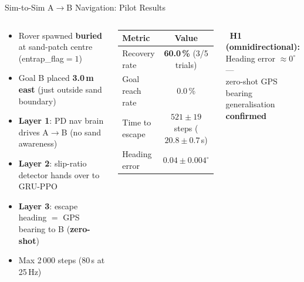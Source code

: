 \documentclass[aspectratio=169, 10pt]{beamer}
\newcommand{\keyword}[1]{\textbf{\color{MarsLight}#1}}
\newcommand{\tick}{\textcolor{AccentGreen}{\faCheckCircle}}
\begin{document}
\begin{frame}{Sim-to-Sim A$\to$B Navigation: Pilot Results}
\vspace{-0.2em}
\begin{columns}[T]

\begin{tcolorbox}[mycard, title={\faFlask\; Experimental Setup ($N{=}5$ trials)}]
  \scriptsize
  \begin{itemize}[leftmargin=1em, itemsep=2pt]
    \item Rover spawned \keyword{buried} at sand-patch centre (entrap\_flag$=1$)
    \item Goal B placed \textbf{3.0\,m east} (just outside sand boundary)
    \item \textbf{Layer 1}: PD nav brain drives A$\to$B (no sand awareness)
    \item \textbf{Layer 2}: slip-ratio detector hands over to GRU-PPO
    \item \textbf{Layer 3}: escape heading $=$ GPS bearing to B (\keyword{zero-shot})
    \item Max 2\,000 steps (80\,s at 25\,Hz)
  \end{itemize}
\end{tcolorbox}

\vspace{0.2em}
\begin{tcolorbox}[mycard, title={\faTable\; Pilot Results ($N{=}5$)}]
  {\tiny\setlength{\tabcolsep}{3pt}
  \begin{tabular}{@{}lc@{}}
    \toprule
    \rowcolor{MarsRust!8}
    \color{StarWhite}\textbf{Metric} & \color{StarWhite}\textbf{Value} \\
    \midrule
    \rowcolor{AccentGreen!8}
    Recovery rate & \textbf{60.0\,\%} (3/5 trials) \\
    \rowcolor{MarsRust!5}
    Goal reach rate & 0.0\,\% \\
    \rowcolor{CardBg}
    Time to escape & $521 \pm 19$ steps ($20.8 \pm 0.7$\,s) \\
    \rowcolor{CardBg}
    Heading error & $0.04 \pm 0.004^\circ$ \\
    \bottomrule
  \end{tabular}
  }
\end{tcolorbox}

\vspace{0.2em}
\begin{tcolorbox}[greenbox]
  \scriptsize\centering
  \tick\ \textbf{H1 (omnidirectional):} Heading error $\approx 0^\circ$ ---\\
  zero-shot GPS bearing generalisation \textbf{confirmed}
\end{tcolorbox}


\end{columns}
\end{frame}
\end{document}
